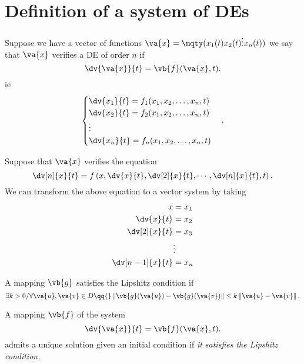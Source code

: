 \part{Definition of a system of DEs}

Suppose we have a vector of functions $\va{x}=\mqty(x_1(t)\\x_2(t)\\\vdots\\x_n(t))$ we say that $\va{x}$ verifies a DE of order $n$ if
\[
	\dv{\va{x}}{t} = \vb{f}(\va{x},t)
	.\]
ie
\[
	\begin{cases}
		\dv{x_1}{t} =f_1(x_1,x_2,\ldots,x_n,t) \\
		\dv{x_2}{t} =f_2(x_1,x_2,\ldots,x_n,t) \\
		\vdots                                 \\
		\dv{x_n}{t} =f_n(x_1,x_2,\ldots,x_n,t) \\
	\end{cases}
	.\]

Suppose that $\va{x}$ verifies the equation
\[
	\dv[n]{x}{t} =f\left( x,\dv{x}{t}, \dv[2]{x}{t}, \cdots, \dv[n]{x}{t}, t  \right)
	.\]
We can transform the above equation to a vector system by taking
\begin{align*}
	x              & = x_1  \\
	\dv{x}{t}      & = x_2  \\
	\dv[2]{x}{t}   & = x_3  \\
	               & \vdots \\
	\dv[n-1]{x}{t} & = x_n
\end{align*}

\begin{theorem}
	A mapping $\vb{g}$ satisfies the Lip{\Huge shit}z condition if
	\[
		\exists k>0 / \forall \va{u},\va{v}\in D \qq{} \left\| \vb{g}(\va{u}) - \vb{g}(\va{v}) \right\| \le k \left\| \va{u}-\va{v} \right\|
		.\]
\end{theorem}

\begin{theorem}
	A mapping $\vb{f}$ of the system
	\[
		\dv{\va{x}}{t} =\vb{f}(\va{x},t)
		.\]
	admits a unique solution given an initial condition if \emph{it satisfies the Lip{\Huge shit}z condition.}
\end{theorem}
